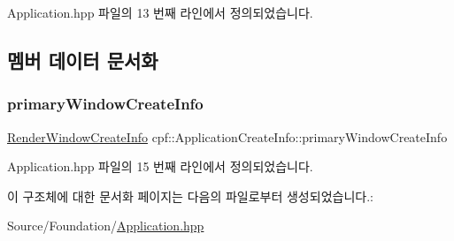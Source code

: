Application.\+hpp 파일의 13 번째 라인에서 정의되었습니다.



\subsection{멤버 데이터 문서화}
\mbox{\label{structcpf_1_1_application_create_info_a1cd605f921ac5ac29474cbe52f7ea499}} 
\subsubsection{\texorpdfstring{primary\+Window\+Create\+Info}{primaryWindowCreateInfo}}
{\footnotesize\ttfamily \hyperlink{structcpf_1_1_render_window_create_info}{Render\+Window\+Create\+Info} cpf\+::\+Application\+Create\+Info\+::primary\+Window\+Create\+Info}



Application.\+hpp 파일의 15 번째 라인에서 정의되었습니다.



이 구조체에 대한 문서화 페이지는 다음의 파일로부터 생성되었습니다.\+:\begin{DoxyCompactItemize}
\item 
Source/\+Foundation/\hyperlink{_application_8hpp}{Application.\+hpp}\end{DoxyCompactItemize}
